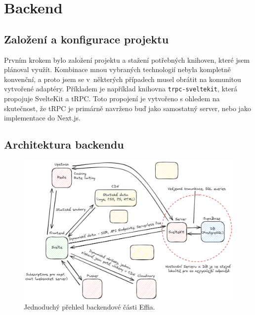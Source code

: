\documentclass[12pt, a4paper,
openright
]{report}
\let\oldchapter\chapter
\renewcommand{\chapter}{
	\clearpage
	\pagestyle{fancy}
	\oldchapter
}
\begin{document}
\chapter{Backend}

\section{Založení a konfigurace projektu}
Prvním krokem bylo založení projektu a stažení potřebných knihoven, které jsem plánoval využít. Kombinace mnou vybraných technologií nebyla kompletně konvenční, a proto jsem se v~některých případech musel obrátit na komunitou vytvořené adaptéry. Příkladem je například knihovna \texttt{trpc-sveltekit}, která propojuje SvelteKit a tRPC. Toto propojení je vytvořeno s ohledem na skutečnost, že tRPC je primárně navrženo buď jako samostatný server, nebo jako implementace do Next.js.

\section{Architektura backendu}
\begin{figure}[h!]
	\centering %
	\includegraphics[width=1\linewidth]{image/effio-architecture.png} 
	\caption{Jednoduchý přehled backendové části Effia.} %
	\label{fig:effio-architecture} %
\end{figure}
\end{document}

